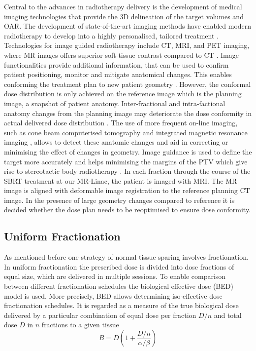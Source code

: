 \documentclass[\relativeRoot/ada.tex]{subfiles}
\begin{document}
Central to the advances in radiotherapy delivery is the development of medical imaging technologies that provide the 3D delineation of the target volumes and OAR. The development of state-­of-­the-­art imaging methods have enabled modern radiotherapy to develop into a highly personalised, tailored treatment \cite{jaffray_imageguided}. Technologies for image guided radiotherapy include CT, MRI, and PET imaging, where MR images offers superior soft-tissue contrast compared to CT \cite{acharya_onlinemrguided}. Image functionalities provide additional information, that can be used to confirm patient positioning, monitor and mitigate anatomical changes. This enables conforming the treatment plan to new patient geometry \cite{jaffray_imageguided}. However, the conformal dose distribution is only achieved on the reference image which is the planning image, a snapshot of patient anatomy. Inter-fractional and intra-factional anatomy changes from the planning image may deteriorate the dose conformity in actual delivered dose distribution \cite{seungjong_deformable}. The use of more frequent on-line imaging, such as cone beam computerised tomography \cite{jaffray_conebeam} and integrated magnetic resonance imaging \cite{lagendijk_integration}, allows to detect these anatomic changes and aid in correcting or minimising the effect of changes in geometry. Image guidance is used to define the target more accurately and helps minimising the margins of the PTV which give rise to stereotactic body radiotherapy \cite{guckenberger_escalate}. In each fraction through the course of the SBRT treatment at our MR-Linac, the patient is imaged with MRI. The MR image is aligned with deformable image registration to the reference planning CT image. In the presence of large geometry changes compared to reference it is decided whether the dose plan needs to be reoptimised to ensure dose conformity.

\subsection{Uniform Fractionation}

As mentioned before one strategy of normal tissue sparing involves fractionation. In uniform fractionation the prescribed dose is divided into dose fractions of equal size, which are delivered in multiple sessions. To enable comparison between different fractionation schedules the biological effective dose (BED) model is used. More precisely, BED allows determining iso-effective dose fractionation schedules. It is regarded as a measure of the true biological dose delivered by a particular combination of equal dose per fraction $D/n$ and total dose $D$ in $n$ fractions to a given tissue \cite{jones_bedrole}
\begin{equation*}
	B = D\left(1+\frac{D / n}{\alpha / \beta}\right)
\end{equation*}
\end{document}
